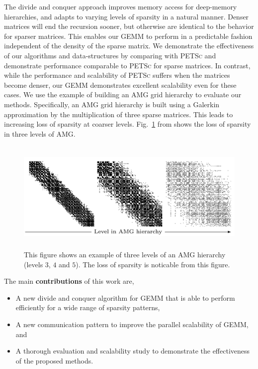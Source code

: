The divide and conquer approach improves memory access for deep-memory hierarchies, and adapts to varying levels of sparsity in a natural manner. Denser matrices will end the recursion sooner, but otherwise are identical to the behavior for sparser matrices. This enables our \textsc{GEMM} to perform in a predictable fashion independent of the density of the sparse matrix. We demonstrate the effectiveness of our algorithms and data-structures by comparing with \textsc{PETSc} \cite{petsc-web-page} and demonstrate performance comparable to \textsc{PETSc} for sparse matrices. In contrast, while the performance and scalability of \textsc{PETSc} suffers when the matrices become denser, our \textsc{GEMM} demonstrates excellent scalability even for these cases. We use the example of building an AMG grid hierarchy to evaluate our methods. Specifically, an AMG grid hierarchy is built using a Galerkin approximation by the multiplication of three sparse matrices. This leads to increasing loss of sparsity at coarser levels. Fig.~\ref{fig:sparsity} from \cite{bienz2016reducing} shows the loss of sparsity in three levels of AMG.

\begin{figure}[hbt]
 \centering
 \includegraphics[width=11.8cm,height=5.4cm]{./figures/AMG_sparsity.png}
 \caption{This figure shows an example of three levels of an AMG hierarchy (levels $3$, $4$ and $5$). The loss of sparsity is noticable from this figure.}
 \label{fig:sparsity}
\end{figure}


The main {\bf contributions} of this work are,
\begin{itemize}
  \item A new divide and conquer algorithm for \textsc{GEMM} that is able to perform efficiently for a wide range of sparsity patterns,
  \item A new communication pattern to improve the parallel scalability of \textsc{GEMM}, and
  \item A thorough evaluation and scalability study to demonstrate the effectiveness of the proposed methods.
\end{itemize}

